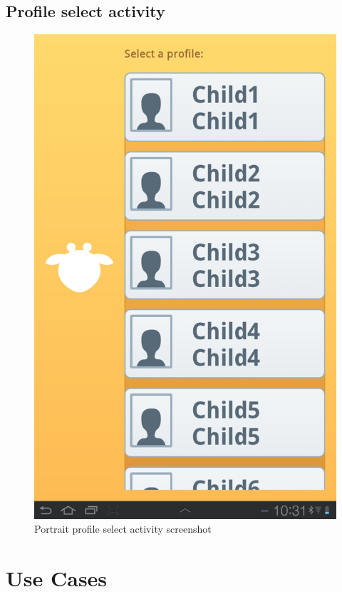 \section{Profile select activity}
\begin{figure}[h!]
	\centering
	\includegraphics[scale=0.3]{gfx/profile-select-activity_1.jpg}
	\caption{Portrait profile select activity screenshot}
	\label{fig:profile-select-activity_1}
\end{figure}

\chapter{Use Cases}
\label{appendix_use_cases}

